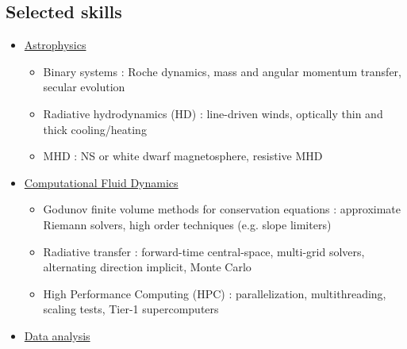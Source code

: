\documentclass[11pt,onecolumn]{article}
\newcommand{\ulxs}{ULXs\xspace}
\begin{document}
%

\subsection*{Selected skills}

\begin{adjustwidth}{-0.5cm}{-0.5cm}
\begin{itemize} 
\setlength\itemsep{-0.2em}
\setlength{\itemindent}{-1em}
\item[] \underline{Astrophysics}
\begin{itemize}[wide = 0pt]
\setlength\itemsep{-0.2em}
\setlength{\itemindent}{-0.5em}
\item Binary systems : Roche dynamics, mass and angular momentum transfer, secular evolution 
\item Radiative hydrodynamics (HD) : line-driven winds, optically thin and thick cooling/heating
\item MHD : NS or white dwarf magnetosphere, resistive MHD
\end{itemize}
\item[] \underline{Computational Fluid Dynamics}
\begin{itemize}[wide = 2pt]
\setlength\itemsep{-0.2em}
\setlength{\itemindent}{-0.5em}
\item Godunov finite volume methods for conservation equations : approximate Riemann solvers, high order techniques (e.g. slope limiters)
\item Radiative transfer : forward-time central-space, multi-grid solvers, alternating direction implicit, Monte Carlo
\item High Performance Computing (HPC) : parallelization, multithreading, scaling tests, Tier-1 supercomputers
\end{itemize}
\item[] \underline{Data analysis } 
\begin{itemize}[wide = 20pt]
\setlength\itemsep{-0.2em}

\end{itemize}
\end{itemize}
\end{adjustwidth}
\end{document}
